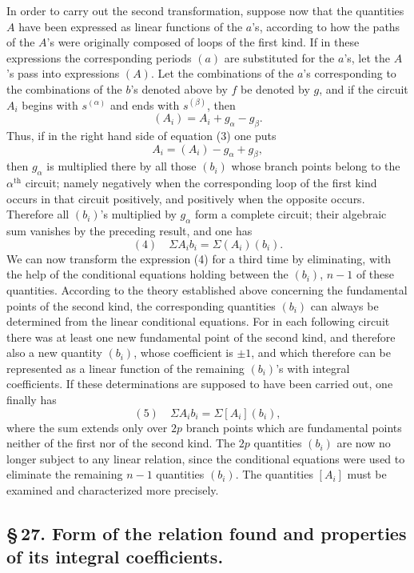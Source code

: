 \documentclass[10pt]{article}
\begin{document}
In order to carry out the second transformation, suppose now that the quantities \(A\) have been expressed as linear functions of the \(a\)'s, according to how the paths of the \(A\)'s were originally composed of loops of the first kind. If in these expressions the corresponding periods \((a)\) are substituted for the \(a\)'s, let the \(A\)'s pass into expressions \((A)\). Let the combinations of the \(a\)'s corresponding to the combinations of the \(b\)'s denoted above by \(f\) be denoted by \(g\), and if the circuit \(A_i\) begins with \(s^{(\alpha)}\) and ends with \(s^{(\beta)}\), then
\[
(A_i)=A_i+g_{\alpha}-g_{\beta}.
\]
Thus, if in the right hand side of equation (3) one puts
\[
A_i=(A_i)-g_{\alpha}+g_{\beta},
\]
then \(g_{\alpha}\) is multiplied there by all those \((b_i)\) whose branch points belong to the \(\alpha^{\text{th}}\) circuit; namely negatively when the corresponding loop of the first kind occurs in that circuit positively, and positively when the opposite occurs. Therefore all \((b_i)\)'s multiplied by \(g_{\alpha}\) form a complete circuit; their algebraic sum vanishes by the preceding result, and one has
\[
(4)\quad \Sigma A_i b_i=\Sigma(A_i)(b_i).
\]
We can now transform the expression (4) for a third time by eliminating, with the help of the conditional equations holding between the \((b_i)\), \(n-1\) of these quantities. According to the theory established above concerning the fundamental points of the second kind, the corresponding quantities \((b_i)\) can always be determined from the linear conditional equations. For in each following circuit there was at least one new fundamental point of the second kind, and therefore also a new quantity \((b_i)\), whose coefficient is \(\pm1\), and which therefore can be represented as a linear function of the remaining \((b_i)\)'s with integral coefficients. If these determinations are supposed to have been carried out, one finally has
\[
(5)\quad \Sigma A_i b_i=\Sigma[A_i](b_i),
\]
where the sum extends only over \(2p\) branch points which are fundamental points neither of the first nor of the second kind. The \(2p\) quantities \((b_i)\) are now no longer subject to any linear relation, since the conditional equations were used to eliminate the remaining \(n-1\) quantities \((b_i)\). The quantities \([A_i]\) must be examined and characterized more precisely.

\subsection*{\S\,27. Form of the relation found and properties of its integral coefficients.}
\end{document}
